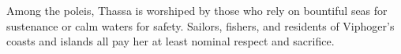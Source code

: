         Among the poleis, Thassa is worshiped by those who rely on bountiful seas for sustenance or calm waters for safety.
        Sailors, fishers, and residents of Viphoger's coasts and islands all pay her at least nominal respect and sacrifice.


